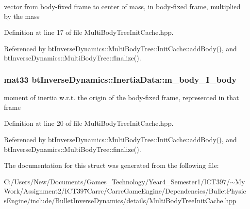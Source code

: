 vector from body-fixed frame to center of mass, in body-fixed frame, multiplied by the mass 

Definition at line 17 of file MultiBodyTreeInitCache.hpp.

Referenced by btInverseDynamics::MultiBodyTree::InitCache::addBody(), and btInverseDynamics::MultiBodyTree::finalize().\hypertarget{structbt_inverse_dynamics_1_1_inertia_data_8812049a71e4002728f5be9d75155fea}{
\subsubsection[m\_\-body\_\-I\_\-body]{\setlength{\rightskip}{0pt plus 5cm}mat33 {\bf btInverseDynamics::InertiaData::m\_\-body\_\-I\_\-body}}}
\label{structbt_inverse_dynamics_1_1_inertia_data_8812049a71e4002728f5be9d75155fea}


moment of inertia w.r.t. the origin of the body-fixed frame, represented in that frame 

Definition at line 20 of file MultiBodyTreeInitCache.hpp.

Referenced by btInverseDynamics::MultiBodyTree::InitCache::addBody(), and btInverseDynamics::MultiBodyTree::finalize().

The documentation for this struct was generated from the following file:\begin{CompactItemize}
\item 
C:/Users/New/Documents/Games\_\-Technology/Year4\_\-Semester1/ICT397/$\sim$My Work/Assignment2/ICT397Carre/CarreGameEngine/Dependencies/BulletPhysicsEngine/include/BulletInverseDynamics/details/MultiBodyTreeInitCache.hpp\end{CompactItemize}
